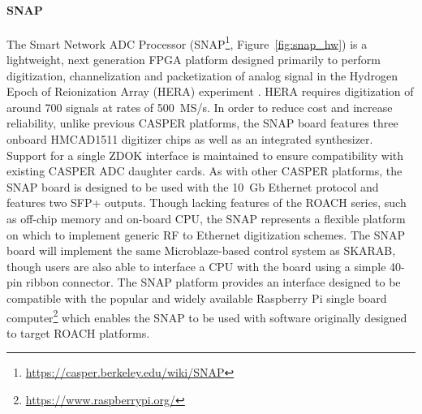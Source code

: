 \documentclass{ws-jai}
\begin{document}
\paragraph*{SNAP}
The Smart Network ADC Processor
(SNAP\footnote{\url{https://casper.berkeley.edu/wiki/SNAP}}, Figure~\ref{fig:snap_hw}) is a lightweight, next generation
FPGA platform designed primarily to perform digitization, channelization and packetization of analog signal in the Hydrogen Epoch of
Reionization Array (HERA) experiment \citep{2016arXiv160607473D}. HERA requires digitization of around 700 signals at rates of 500~MS/s. In order to reduce cost and increase reliability, unlike previous CASPER platforms, the SNAP board features three onboard HMCAD1511 digitizer chips as well as an integrated synthesizer. Support for a single ZDOK interface is maintained to ensure compatibility with existing CASPER ADC daughter cards.
As with other CASPER platforms, the SNAP board is designed to be used with the 10~Gb Ethernet protocol and features two SFP+ outputs. Though lacking features of the ROACH series, such as off-chip memory and on-board CPU, the SNAP represents a flexible platform on which to implement generic RF to Ethernet digitization schemes.
The SNAP board will implement the same Microblaze-based control system as SKARAB, though users are also able to interface a CPU with the board using a simple 40-pin ribbon connector. The SNAP platform provides an interface designed to be compatible with the popular and widely available Raspberry Pi single board computer\footnote{\url{https://www.raspberrypi.org/}} which enables the SNAP to be used with software originally designed to target ROACH platforms.
% 
\end{document}
